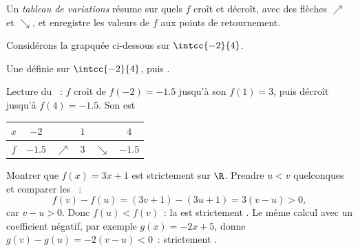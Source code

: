 \begin{definition}\label{def:g10:functions:table}
Un \emph{tableau de variations} résume sur
quels  $f$ croît et décroît, avec des flèches $\nearrow$ et
$\searrow$, et enregistre les valeurs de $f$ aux points de retournement.
\end{definition}

\begin{example}\label{ex:g10:functions:table}
Considérons la  grapquée ci-dessous sur $\intcc{-2}{4}$.

\begin{omfigure}

{\small Une  définie sur $\intcc{-2}{4}$,  puis
.}
\end{omfigure}

Lecture du ~: $f$ croît de $f(-2) = -1.5$ jusqu'à son 
$f(1) = 3$, puis décroît jusqu'à $f(4) = -1.5$. Son 
est
\begin{center}
\renewcommand{\arraystretch}{1.3}
\begin{tabular}{c|ccccc}
$x$ & $-2$ & & $1$ & & $4$ \\
\hline
$f$ & $-1.5$ & $\nearrow$ & $3$ & $\searrow$ & $-1.5$ \\
\end{tabular}
\end{center}
\end{example}

\begin{example}\label{ex:g10:functions:proof}
Montrer que $f(x) = 3x + 1$ est strictement  sur $\R$.
Prendre $u < v$ quelconques et comparer les ~:
\[
f(v) - f(u) = (3v + 1) - (3u + 1) = 3(v - u) > 0,
\]
car $v - u > 0$. Donc $f(u) < f(v)$~: la  est strictement
. Le même calcul avec un coefficient négatif, par exemple
$g(x) = -2x + 5$, donne $g(v) - g(u) = -2(v-u) < 0$~: strictement
.
\end{example}

